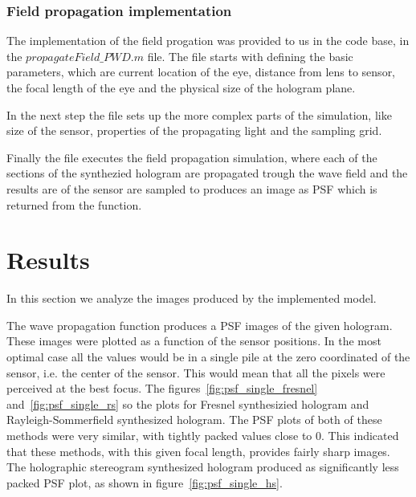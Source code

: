 \documentclass[12pt,a4paper,english
]{tunithesis}
\begin{document}
\subsection{Field propagation implementation}
The implementation of the field progation was provided to us in the code base, in the $propagateField\_PWD.m$ file. The file starts with defining the basic parameters, which are current location of the eye, distance from lens to sensor, the focal length of the eye and the physical size of the hologram plane.

In the next step the file sets up the more complex parts of the simulation, like size of the sensor, properties of the propagating light and the sampling grid.

Finally the file executes the field propagation simulation, where each of the sections of the synthezied hologram are propagated trough the wave field and the results are of the sensor are sampled to produces an image as PSF which is returned from the function.


\chapter{Results}
\label{sec:results}
In this section we analyze the images produced by the implemented model.

The wave propagation function produces a PSF images of the given hologram. These images were plotted as a function of the sensor positions. In the most optimal case all the values would be in a single pile at the zero coordinated of the sensor, i.e. the center of the sensor. This would mean that all the pixels were perceived at the best focus. The figures~\ref{fig:psf_single_fresnel} and~\ref{fig:psf_single_rs} so the plots for Fresnel synthesizied hologram and Rayleigh-Sommerfield synthesized hologram. The PSF plots of both of these methods were very similar, with tightly packed values close to 0. This indicated that these methods, with this given focal length, provides fairly sharp images. The holographic stereogram synthesized hologram produced as significantly less packed PSF plot, as shown in figure~\ref{fig:psf_single_hs}.
\end{document}
